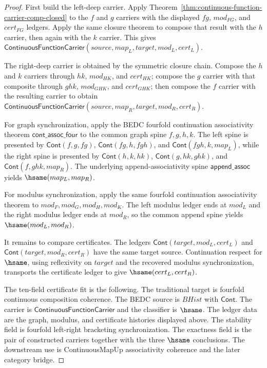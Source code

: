 \begin{proof}
First build the left-deep carrier. Apply
Theorem~\ref{thm:continuous-function-carrier-comp-closed} to the $f$ and $g$
carriers with the displayed $fg$, $mod_{FG}$, and $cert_{FG}$ ledgers. Apply
the same closure theorem to compose that result with the $h$ carrier, then
again with the $k$ carrier. This gives
$\mathsf{ContinuousFunctionCarrier}(source,map_L,target,mod_L,cert_L)$.

The right-deep carrier is obtained by the symmetric closure chain. Compose the
$h$ and $k$ carriers through $hk$, $mod_{HK}$, and $cert_{HK}$; compose the
$g$ carrier with that composite through $ghk$, $mod_{GHK}$, and $cert_{GHK}$;
then compose the $f$ carrier with the resulting carrier to obtain
$\mathsf{ContinuousFunctionCarrier}(source,map_R,target,mod_R,cert_R)$.

For graph synchronization, apply the BEDC fourfold continuation associativity
theorem $\mathsf{cont\_assoc\_four}$ to the common graph spine
$f,g,h,k$. The left spine is presented by
$\mathsf{Cont}(f,g,fg)$, $\mathsf{Cont}(fg,h,fgh)$, and
$\mathsf{Cont}(fgh,k,map_L)$, while the right spine is presented by
$\mathsf{Cont}(h,k,hk)$, $\mathsf{Cont}(g,hk,ghk)$, and
$\mathsf{Cont}(f,ghk,map_R)$. The underlying append-associativity spine
$\mathsf{append\_assoc}$ yields $\hsame(map_L,map_R)$.

For modulus synchronization, apply the same fourfold continuation
associativity theorem to $mod_F,mod_G,mod_H,mod_K$. The left modulus ledger
ends at $mod_L$ and the right modulus ledger ends at $mod_R$, so the common
append spine yields $\hsame(mod_L,mod_R)$.

It remains to compare certificates. The ledgers
$\mathsf{Cont}(target,mod_L,cert_L)$ and
$\mathsf{Cont}(target,mod_R,cert_R)$ have the same target source. Continuation
respect for $\hsame$, using reflexivity on $target$ and the recovered modulus
synchronization, transports the certificate ledger to give
$\hsame(cert_L,cert_R)$.

The ten-field certificate fit is the following. The traditional target is
fourfold continuous composition coherence. The BEDC source is $BHist$ with
$\mathsf{Cont}$. The carrier is $\mathsf{ContinuousFunctionCarrier}$ and the
classifier is $\hsame$. The ledger data are the graph, modulus, and
certificate histories displayed above. The stability field is fourfold
left-right bracketing synchronization. The exactness field is the pair of
constructed carriers together with the three $\hsame$ conclusions. The
downstream use is ContinuousMapUp associativity coherence and the later
category bridge.
\end{proof}

